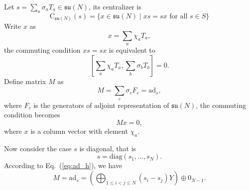 \documentclass{article}
\begin{document}
Let $s = \sum_a\sigma_aT_a\in \mathfrak{su}(N)$, its centralizer is
\begin{equation}
  \text{C}_{\mathfrak{su}(N)}(s) = \{x\in \mathfrak{su}(N) \mid xs=sx \text{ for all } s\in S\}
\end{equation}
Write $x$ as
\begin{equation}
  x = \sum_a \chi_aT_a,
\end{equation}
the commuting condition $xs = sx$ is equivalent to
\begin{equation}
 \left[\sum_a\chi_aT_a, \sum_b\sigma_bT_b\right] = 0.
\end{equation}
Define matrix $M$ as
\begin{equation}
  M = \sum_c\sigma_cF_c = \text{ad}_s,
\end{equation}
where $F_c$ is the generators of adjoint representation of $\mathfrak{su}(N)$,
the commuting condition becomes
\begin{equation}
  \label{eq:mx_eq_0}
  Mx = 0,
\end{equation}
where $x$ is a column vector with element $\chi_a$.

Now consider the case $s$ is diagonal, that is
\begin{equation}
  s = \text{diag}(s_1,\ldots,s_N).
\end{equation}
According to Eq.~(\ref{eq:ad_h}), we have
\begin{equation}
  M = \text{ad}_s = \left(\bigoplus_{1\le i < j\le N}(s_i-s_j)Y\right)
  \oplus0_{N-1}.
\end{equation}
\end{document}
